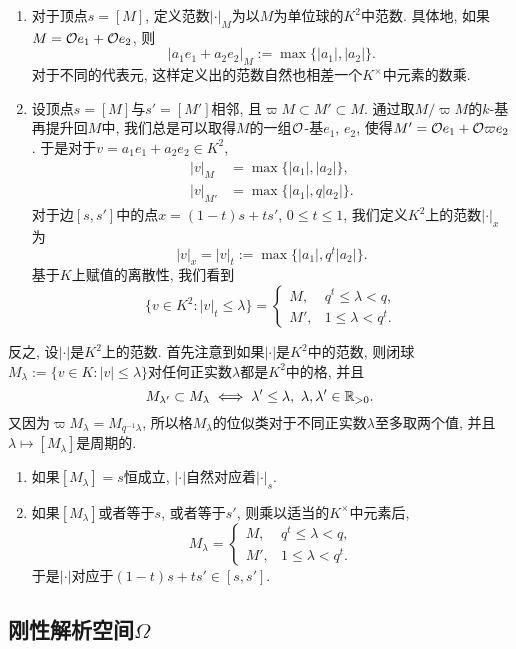 \begin{enumerate}
    \item 对于顶点$s = [M]$, 定义范数$|\cdot|_M$为以$M$为单位球的$K^2$中范数.
    具体地, 如果$M = \mathcal{O} e_1 + \mathcal{O} e_2$, 则\[|a_1e_1 + a_2e_2|_M := \max\{|a_1|, |a_2|\}.\]
    对于不同的代表元, 这样定义出的范数自然也相差一个$K^\times$中元素的数乘.
    \item 设顶点$s = [M]$与$s' = [M']$相邻, 且$\varpi M\subset M'\subset M$.
    通过取$M/\varpi M$的$k$-基再提升回$M$中, 我们总是可以取得$M$的一组$\mathcal{O}$-基$e_1$, $e_2$, 使得$M' = \mathcal{O} e_1 + \mathcal{O} \varpi e_2$.
    于是对于$v = a_1e_1 + a_2e_2\in K^2$, \begin{align*}
        |v|_M &= \max\{|a_1|, |a_2|\},\\
        |v|_{M'} &= \max\{|a_1|, q|a_2|\}.
    \end{align*}
    对于边$[s, s']$中的点$x = (1-t)s + ts'$, $0\le t\le 1$, 我们定义$K^2$上的范数$|\cdot|_x$为\[|v|_x = |v|_t := \max\{|a_1|, q^t|a_2|\}.\]
    基于$K$上赋值的离散性, 我们看到\[\{v\in K^2 : |v|_t\le\lambda\} = \begin{cases}
        M, & q^t\le \lambda < q,\\
        M', & 1\le \lambda < q^t.
    \end{cases}\]
\end{enumerate}

反之, 设$|\cdot|$是$K^2$上的范数. 
首先注意到如果$|\cdot|$是$K^2$中的范数, 则闭球$M_\lambda := \{v\in K : |v|\le \lambda\}$对任何正实数$\lambda$都是$K^2$中的格,
并且\[M_{\lambda'}\subset M_{\lambda}\iff \lambda' \le \lambda,\ \lambda,\lambda'\in\mathbb{R}_{>0}.\]
又因为$\varpi M_{\lambda} = M_{q^{-1}\lambda}$, 所以格$M_\lambda$的位似类对于不同正实数$\lambda$至多取两个值, 并且$\lambda\mapsto[ M_{\lambda}]$是周期的.
\begin{enumerate}
    \item 如果$[M_\lambda] = s$恒成立, $|\cdot|$自然对应着$|\cdot|_s$.
    \item 如果$[M_\lambda]$或者等于$s$, 或者等于$s'$, 则乘以适当的$K^\times$中元素后, \[M_\lambda = \begin{cases}
        M, & q^t\le \lambda < q,\\
        M', & 1\le \lambda < q^t.
    \end{cases}\]于是$|\cdot|$对应于$(1-t)s + ts'\in [s, s']$.
\end{enumerate}

\subsection{刚性解析空间$\Omega$}

